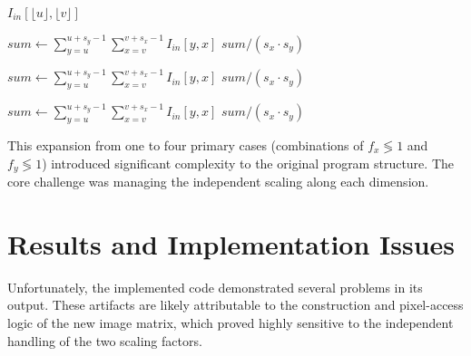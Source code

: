 \documentclass[10pt]{article}
\begin{document}
\begin{algorithm}
\caption{Pixel Computation}
\begin{algorithmic}[1]
        \State \Return $I_{in}[\lfloor u \rfloor, \lfloor v \rfloor]$ 
    \EndIf
    
        \State $sum \gets \sum_{y=u}^{u+s_y-1} \sum_{x=v}^{v+s_x-1} I_{in}[y,x]$
        \State \Return $sum / (s_x \cdot s_y)$ 
    \EndIf
    
        \State $sum \gets \sum_{y=u}^{u+s_y-1} \sum_{x=v}^{v+s_x-1} I_{in}[y,x]$
        \State \Return $sum / (s_x \cdot s_y)$ 
    \EndIf
    
        \State $sum \gets \sum_{y=u}^{u+s_y-1} \sum_{x=v}^{v+s_x-1} I_{in}[y,x]$
        \State \Return $sum / (s_x \cdot s_y)$ 
    \EndIf
\EndFunction
\end{algorithmic}
\end{algorithm}


This expansion from one to four primary cases (combinations of $f_x \lessgtr 1$ and $f_y \lessgtr 1$) introduced significant complexity to the original program structure. The core challenge was managing the independent scaling along each dimension.

\section{Results and Implementation Issues}

Unfortunately, the implemented code demonstrated several problems in its output. These artifacts are likely attributable to the construction and pixel-access logic of the new image matrix, which proved highly sensitive to the independent handling of the two scaling factors.
\end{document}
